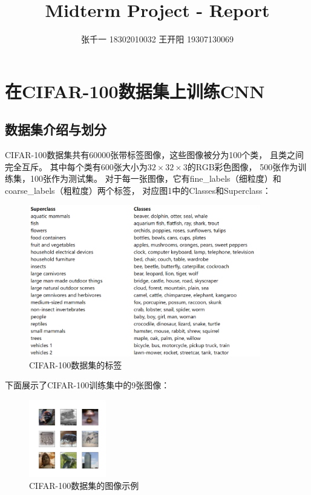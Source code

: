 \documentclass[UTF8]{ctexart}
\title{Midterm Project - Report}
\author{张千一 18302010032 王开阳 19307130069}
\begin{document}
\maketitle

\tableofcontents

\newpage
\section{在CIFAR-100数据集上训练CNN}
\label{sec: CNN}
\subsection{数据集介绍与划分}
CIFAR-100数据集共有60000张带标签图像，这些图像被分为100个类，
且类之间完全互斥。
其中每个类有600张大小为$32\times32\times3$的RGB彩色图像，
500张作为训练集，100张作为测试集。
对于每一张图像，它有fine\_labels（细粒度）和coarse\_labels（粗粒度）两个标签，
对应图1中的Classes和Superclass：

\begin{figure}[htbp]
    \centering
    \includegraphics[width=0.90\textwidth]{../img/cifar100-classes.png}
    \caption{CIFAR-100数据集的标签}
\end{figure}

下面展示了CIFAR-100训练集中的9张图像：

\begin{figure}[htbp]
    \centering
    \includegraphics[width=0.30\textwidth]{../img/cifar100.png}
    \caption{CIFAR-100数据集的图像示例}
\end{figure}
\end{document}
